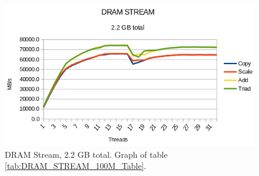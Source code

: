 \documentclass[12pt,a4paper,USenglish]{article}      %
\begin{document}
\begin{figure}[!hbtp]
\includegraphics[scale=0.7]{Benchmarks/DRAM_STREAM_100M_Figure.png}
\caption{DRAM Stream, 2.2 GB total. Graph of table \ref{tab:DRAM_STREAM_100M_Table}.}
\label{fig:DRAM_STREAM_100M_Figure}
\end{figure}
\end{document}

